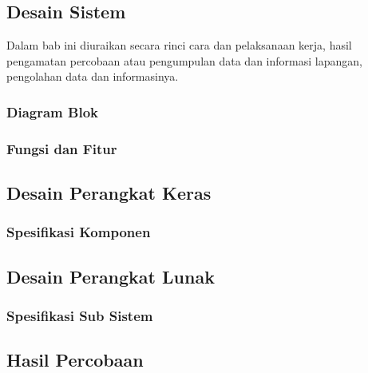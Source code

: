 \documentclass{final_project}
\begin{document}


\subsection{Desain Sistem}

Dalam bab ini diuraikan secara rinci cara dan pelaksanaan kerja, hasil pengamatan percobaan atau pengumpulan data dan informasi lapangan, pengolahan data dan informasinya.

\subsubsection{Diagram Blok}

\subsubsection{Fungsi dan Fitur}

\subsection{Desain Perangkat Keras}

\subsubsection{Spesifikasi Komponen}

\subsection{Desain Perangkat Lunak}

\subsubsection{Spesifikasi Sub Sistem}


\subsection{Hasil Percobaan}
\end{document}
